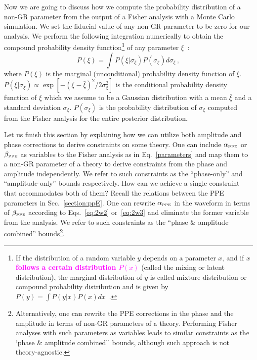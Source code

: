 \documentclass[prd,twocolumn,nofootinbib]{revtex4-1}
\newcommand\be{\begin{equation}}
\newcommand\ee{\end{equation}}
\newcommand{\lb}{\left(}
\newcommand{\rb}{\right)}
\newcommand{\PPE}{{\mbox{\tiny PPE}}}
\newcommand{\kent}[1]{\textcolor{magenta}{\textbf{#1}} }
\begin{document}
Now we are going to discuss how we compute the probability distribution of a non-GR parameter from the output of a Fisher analysis with a Monte Carlo simulation. We set the  fiducial value of any non-GR parameter to be zero for our analysis. We perform the following integration numerically to obtain the compound probability density function\footnote{If the distribution of a random variable $y$ depends on a parameter $x$, and if $x$ \kent{follows a certain distribution $P(x)$} (called the mixing or latent distribution), the marginal distribution of $y$ is called mixture distribution or compound probability distribution and is given by $P\left(y\right)=\int P\left(y|x\right) P\left(x\right)dx$~\cite{2016arXiv160204060R}.} of any parameter $\xi$~:
\be
\label{eq3:1}
P\lb\xi\rb=\int P\lb \xi|\sigma_{\xi}\rb P\lb \sigma_{\xi}\rb d\sigma_{\xi}\,,
\ee
where $P\lb\xi\rb$ is the marginal (unconditional) probability density function of $\xi$. $P\lb \xi|\sigma_{\xi}\rb \propto \exp[-(\xi-\bar \xi)^2/2\sigma_{\xi}^2]$ is the conditional probability density function of $\xi$ which we assume to be a Gaussian distribution with a mean $\bar \xi$ and a standard deviation $\sigma_\xi$. $P(\sigma_\xi)$ is the probability distribution of $\sigma_\xi$ computed from the Fisher analysis for the entire posterior distribution.


Let us finish this section by explaining how we can utilize both amplitude and phase corrections to derive constraints on some theory. One can include $\alpha_{\PPE}$ or $\beta_{\PPE}$ as variables to the Fisher analysis as in Eq.~\eqref{parameters} and map them to a non-GR parameter of a theory to derive constraints from the phase and amplitude independently. We refer to such constraints as  the ``phase-only'' and ``amplitude-only'' bounds respectively. How can we achieve a single constraint that accommodates both of them? Recall the relations between the PPE parameters in Sec.~\ref{section:ppE}. One can rewrite $\alpha_{\PPE}$ in the waveform in terms of $\beta_{\PPE}$ according to Eqs.~\eqref{eq:2w2} or~\eqref{eq:2w3} and eliminate the former variable from the analysis. %
We refer to such constraints as the ``phase \& amplitude combined'' bounds\footnote{Alternatively, one can rewrite the PPE corrections in the phase and the amplitude  in terms of non-GR parameters of a theory. Performing Fisher analyses with such parameters as variables leads to similar constraints as the `phase \& amplitude combined'' bounds, although such approach is not theory-agnostic.}.
\end{document}
